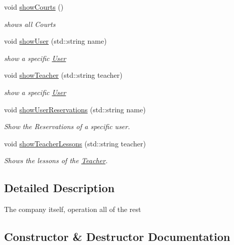 \begin{DoxyCompactItemize}
void \mbox{\hyperlink{class_company_a1779c78bdc9a4416a482be25b71efcd0}{show\+Courts}} ()
\begin{DoxyCompactList}\small\item\em shows all Courts \end{DoxyCompactList}\item 
void \mbox{\hyperlink{class_company_a664aa9b9bde35eae3a564edec73cf5b3}{show\+User}} (std\+::string name)
\begin{DoxyCompactList}\small\item\em show a specific \mbox{\hyperlink{class_user}{User}} \end{DoxyCompactList}\item 
void \mbox{\hyperlink{class_company_aa64ff74648761cfe39d4a9fb0c72031f}{show\+Teacher}} (std\+::string teacher)
\begin{DoxyCompactList}\small\item\em show a specific \mbox{\hyperlink{class_user}{User}} \end{DoxyCompactList}\item 
void \mbox{\hyperlink{class_company_a428b70dbf9acd5edb34ee131ff1f8613}{show\+User\+Reservations}} (std\+::string name)
\begin{DoxyCompactList}\small\item\em Show the Reservations of a specific user. \end{DoxyCompactList}\item 
void \mbox{\hyperlink{class_company_aef95f2feab286505091c38db23cd1c90}{show\+Teacher\+Lessons}} (std\+::string teacher)
\begin{DoxyCompactList}\small\item\em Shows the lessons of the \mbox{\hyperlink{class_teacher}{Teacher}}. \end{DoxyCompactList}\end{DoxyCompactItemize}


\subsection{Detailed Description}
The company itself, operation all of the rest 

\subsection{Constructor \& Destructor Documentation}
\mbox{\label{class_company_ac038a4c5e02f13a7bab9b5139990316e}} 

